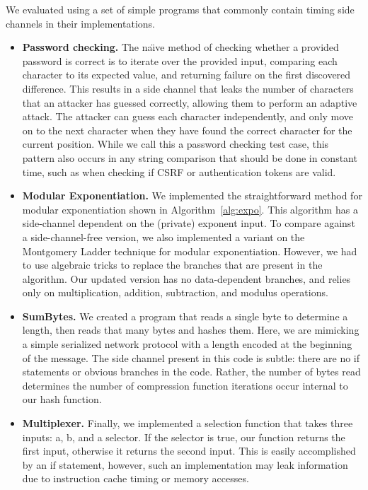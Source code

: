 We evaluated \jcupid using a set of simple programs that commonly contain timing
side channels in their implementations.

\begin{itemize}
\item \textbf{Password checking.}
The na\"{\i}ve method of checking whether a provided password is correct is to iterate
over the provided input, comparing each character to its expected value, and
returning failure on the first discovered difference. This results in a side
channel that leaks the number of characters that an attacker has guessed
correctly, allowing them to perform an adaptive attack. The attacker can guess
each character independently, and only move on to the next character when they
have found the correct character for the current position. While we call this a
password checking test case, this pattern also occurs in any string comparison
that should be done in constant time, such as when checking if CSRF or
authentication tokens are valid.

\item 
\textbf{Modular Exponentiation.}
We implemented the straightforward method for modular exponentiation shown in
Algorithm~\ref{alg:expo}. This algorithm has a side-channel dependent on the
(private) exponent input. To compare against a side-channel-free version,
we also implemented a variant on the Montgomery Ladder
technique for modular exponentiation. However, we had to use algebraic tricks to
replace the branches that are present in the algorithm. Our updated version has no
data-dependent branches, and relies only on multiplication, addition,
subtraction, and modulus operations.

\item
\textbf{SumBytes.}
We created a program that reads a single byte to determine a length, then reads
that many bytes and hashes them. Here, we are mimicking a simple serialized
network protocol with a length encoded at the beginning of the message. The side
channel present in this code is subtle: there are no if statements or obvious
branches in the code. Rather, the number of bytes read determines the number of
compression function iterations occur internal to our hash function.
\item 
\textbf{Multiplexer.}
Finally, we implemented a selection function that takes three inputs: a, b, and
a selector. If the selector is true, our function returns the first input,
otherwise it returns the second input. This is easily accomplished by an if
statement, however, such an implementation may leak information due to instruction cache timing or
memory accesses.
\end{itemize}


